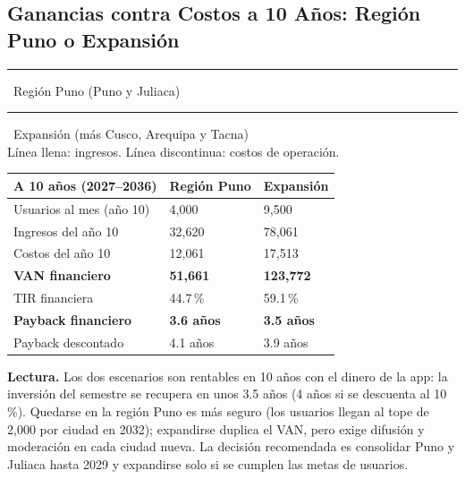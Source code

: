 \documentclass[11pt,a4paper]{article}
\newenvironment{hojah}[1]{\clearpage\begin{landscape}\thispagestyle{horizontal}\section{#1}}{\end{landscape}}
\begin{document}
\begin{hojah}{Ganancias contra Costos a 10 Años: Región Puno o Expansión}
\begin{minipage}[c]{14.6cm}
\begin{adjustbox}{width=\linewidth}
\end{adjustbox}
{\small \textcolor{Rama4}{\rule{16pt}{3pt}}~Región Puno (Puno y Juliaca) \quad \textcolor{AzulUNA}{\rule{16pt}{3pt}}~Expansión (más Cusco, Arequipa y Tacna)\\ Línea llena: ingresos. Línea discontinua: costos de operación.}
\end{minipage}\hfill
\begin{minipage}[c]{8.6cm}
{\small
\setlength{\tabcolsep}{3pt}
\noindent\begin{tabularx}{\linewidth}{@{}L Q{1.9cm} Q{1.9cm}@{}}
\toprule
{}
\textbf{A 10 años (2027--2036)} & \textbf{Región Puno} & \textbf{Expansión} \\
\midrule
Usuarios al mes (año 10) & 4,000 & 9,500 \\
Ingresos del año 10 & 32,620 & 78,061 \\
Costos del año 10 & 12,061 & 17,513 \\
\textbf{VAN financiero} & \textbf{51,661} & \textbf{123,772} \\
TIR financiera & 44.7\,\% & 59.1\,\% \\
\textbf{Payback financiero} & \textbf{3.6 años} & \textbf{3.5 años} \\
Payback descontado & 4.1 años & 3.9 años \\
\bottomrule
\end{tabularx}
}

\vspace{0.2cm}
{\small\noindent\textbf{Lectura.} Los dos escenarios son rentables en 10 años con el dinero de la app: la inversión del semestre se recupera en unos 3.5 años (4 años si se descuenta al 10\,\%). Quedarse en la región Puno es más seguro (los usuarios llegan al tope de 2,000 por ciudad en 2032); expandirse duplica el VAN, pero exige difusión y moderación en cada ciudad nueva. La decisión recomendada es consolidar Puno y Juliaca hasta 2029 y expandirse solo si se cumplen las metas de usuarios.}


\end{minipage}
\end{hojah}
\end{document}
